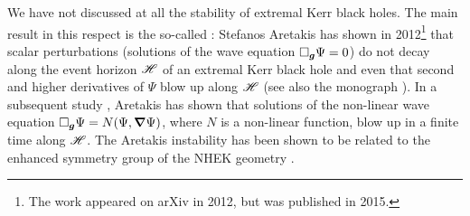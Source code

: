 We have not discussed at all the stability of extremal Kerr black holes.
The main result in this respect is the so-called : Stefanos Aretakis has shown in 2012\footnote{The work \cite{Areta15} appeared
on arXiv in 2012, but was published in 2015.} that scalar perturbations
(solutions of the wave equation $\Box_{\bm{g}} \Psi = 0$)
do not decay along the event horizon $\mathscr{H}$ of an extremal Kerr black hole
and even that second and higher derivatives of $\Psi$ blow
up along $\mathscr{H}$ \cite{Areta15}
(see also the monograph \cite{Areta18}). In a subsequent study \cite{Areta13},
Aretakis has shown that solutions of the non-linear wave equation $\Box_{\bm{g}}\Psi = N(\Psi,\bm{\nabla}\Psi)$, where  $N$ is a non-linear function,
blow up in a finite time along $\mathscr{H}$.
The Aretakis instability has been shown to be related to the
enhanced symmetry group of the NHEK geometry \cite{GrallZ18}.







